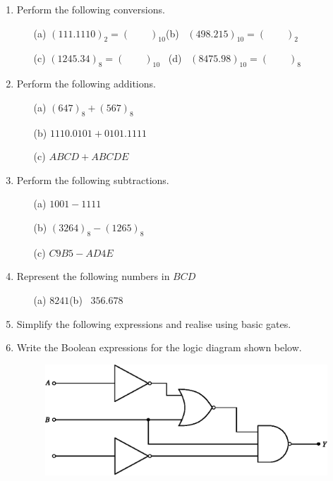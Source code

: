 \begin{enumerate}
\renewcommand{\labelenumi}{\bf\theenumi.}
\item Perform the following conversions.
\begin{itemize}
\item[(a)] $(111.1110)_{2}=(\qquad)_{10}$\qquad (b)~ $(498.215)_{10}=(\qquad)_{2}$

\item[(c)] $(1245.34)_{8}=(\qquad)_{10}$\qquad~ (d)~ $(8475.98)_{10}=(\qquad)_{8}$

\end{itemize}

\item Perform the following additions.
\begin{itemize}
\item[(a)] $(647)_{8}+(567)_{8}$

\item[(b)] $1110.0101+0101.1111$

\item[(c)] $ABCD+ABCDE$
\end{itemize}

\item Perform the following subtractions.
\begin{itemize}
\item[(a)] $1001-1111$

\item[(b)] $(3264)_{8}-(1265)_{8}$

\item[(c)] $C9B5-AD4E$
\end{itemize}

\vfill\eject

\item Represent the following numbers in $BCD$
\begin{itemize}
\item[(a)] $8241$\qquad\qquad (b)~ $356.678$
\end{itemize}

\item Simplify the following expressions and realise using basic gates.

\item Write the Boolean expressions for the logic diagram shown below.
\begin{figure}[H]
\centering
\includegraphics{chap6/exr6.6.eps}
\end{figure}
\end{enumerate}


